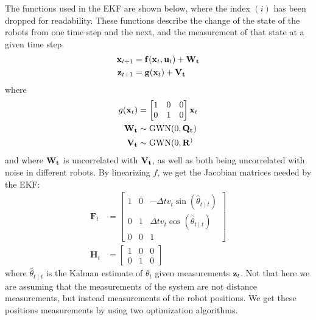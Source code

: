 The functions used in the EKF are shown below, where the index $(i)$ has been dropped for readability. These functions describe the change of the state of the robots from one time step and the next, and the measurement of that state at a given time step.
\begin{align}
    \mathbf{x}_{t+1} &= \f(\mathbf{x}_t, \totu) + \W \\
    \totmeas[t+1] &= \g(\totstate) + \V
\end{align}
where
\begin{align}
    g(\totstate) &= \begin{bmatrix}
        1 & 0 & 0 \\
        0 & 1 & 0
    \end{bmatrix} \totstate \\
    \W &\sim \text{GWN} (0, \Q) \\
    \V &\sim \text{GWN} (0, \R) 
\end{align}
and where $\W$ is uncorrelated with $\V$, as well as both being uncorrelated with noise in different robots. By linearizing $f$, we get the Jacobian matrices needed by the EKF:
\begin{align}
    \mathbf{F}_t &=\begin{bmatrix}
        1 & 0 & -\Delta t v_{t} \sin(\hat{\theta}_{t \mid t}) \\
        0 & 1 & \Delta t v_{t} \cos(\hat{\theta}_{t \mid t}) \\
        0 & 0 & 1
    \end{bmatrix} \\
    \mathbf{H}_t &= \begin{bmatrix}
        1 & 0 & 0 \\
        0 & 1 & 0
    \end{bmatrix}
\end{align}
where $\hat{\theta}_{t \mid t}$ is the Kalman estimate of $\theta_t$ given measurements $\totmeas$. Not that here we are assuming that the measurements of the system are not distance measurements, but instead measurements of the robot positions. We get these positions measurements by using two optimization algorithms. 

